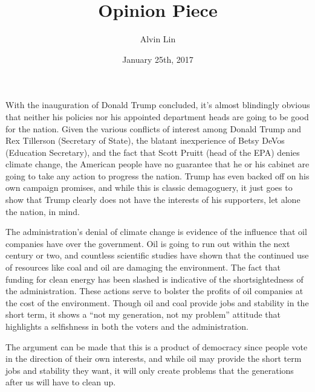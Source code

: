 \documentclass[letterpaper, 12pt]{article}
\title{Opinion Piece}
\author{Alvin Lin}
\date{January 25th, 2017}
\begin{document}
\maketitle

With the inauguration of Donald Trump concluded, it's almost blindingly obvious that neither his policies nor his appointed department heads are going to be good for the nation. Given the various conflicts of interest among Donald Trump and Rex Tillerson (Secretary of State), the blatant inexperience of Betsy DeVos (Education Secretary), and the fact that Scott Pruitt (head of the EPA) denies climate change, the American people have no guarantee that he or his cabinet are going to take any action to progress the nation. Trump has even backed off on his own campaign promises, and while this is classic demagoguery, it just goes to show that Trump clearly does not have the interests of his supporters, let alone the nation, in mind. \par
The administration's denial of climate change is evidence of the influence that oil companies have over the government. Oil is going to run out within the next century or two, and countless scientific studies have shown that the continued use of resources like coal and oil are damaging the environment. The fact that funding for clean energy has been slashed is indicative of the shortsightedness of the administration. These actions serve to bolster the profits of oil companies at the cost of the environment. Though oil and coal provide jobs and stability in the short term, it shows a ``not my generation, not my problem'' attitude that highlights a selfishness in both the voters and the administration. \par
The argument can be made that this is a product of democracy since people vote in the direction of their own interests, and while oil may provide the short term jobs and stability they want, it will only create problems that the generations after us will have to clean up.
\end{document}
